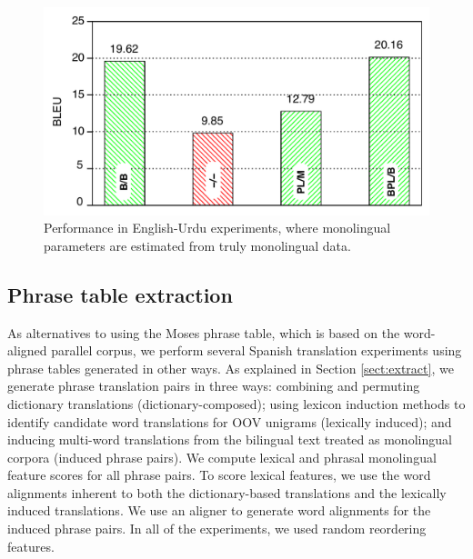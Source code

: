 \documentclass[11pt]{article}
\begin{document}
\begin{figure}[t]
\includegraphics[width=\linewidth]{../figures/urdu/urdulegendanni.pdf}
\caption{Performance in English-Urdu experiments, where monolingual parameters are estimated from truly  monolingual data.}
\label{fig:urdu}
\end{figure}



\subsection{Phrase table extraction}\label{sect:exp:pt}
As alternatives to using the Moses phrase table, which is based on the word-aligned parallel corpus, we perform several Spanish translation experiments using phrase tables generated in other ways. As explained in Section \ref{sect:extract}, we generate phrase translation pairs in three ways: combining and permuting dictionary translations (dictionary-composed); using lexicon induction methods to identify candidate word translations for OOV unigrams (lexically induced); and inducing multi-word translations from the bilingual text treated as monolingual corpora (induced phrase pairs). We compute lexical and phrasal monolingual feature scores for all phrase pairs. To score lexical features, we use the word alignments inherent to both the dictionary-based translations and the lexically induced translations. We use an aligner \cite{DeNero07} to generate word alignments for the induced phrase pairs. In all of the experiments, we used random reordering features.
\end{document}
